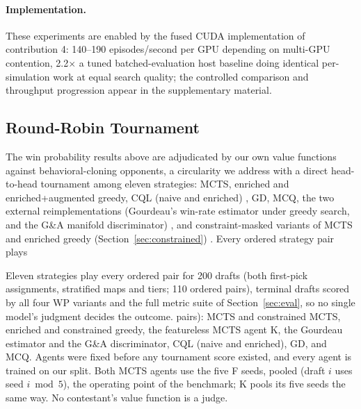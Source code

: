 \documentclass[journal]{IEEEtran}
\providecommand{\DIFaddtex}[1]{{\protect\color{blue} \sf #1}} %
\providecommand{\DIFdeltex}[1]{{\protect\color{red} \scriptsize #1}} %
\providecommand{\DIFaddbegin}{} %
\providecommand{\DIFaddend}{} %
\providecommand{\DIFdelbegin}{} %
\providecommand{\DIFdelend}{} %
\providecommand{\DIFadd}[1]{\texorpdfstring{\DIFaddtex{#1}}{#1}} %
\providecommand{\DIFdel}[1]{\texorpdfstring{\DIFdeltex{#1}}{}} %
\begin{document}
\DIFdelbegin \paragraph{\DIFdel{Implementation.}} %
\addtocounter{paragraph}{-1}%
\DIFdel{These experiments are enabled by the fused CUDA implementation of contribution 4: 140--190 episodes/second per GPU depending on multi-GPU contention, 2.2$\times$ a tuned batched-evaluation host baseline doing identical per-simulation work at equal search quality; the controlled comparison and throughput progression appear in the supplementary material.
}%

\DIFdelend \subsection{Round-Robin Tournament}
\label{sec:tournament}
\DIFdelbegin %

\DIFdel{The win probability results above are adjudicated by our own value functions against behavioral-cloning opponents, a circularity we address with a direct head-to-head tournament among eleven strategies: MCTS, enriched and enriched+augmented greedy, CQL (naive and enriched) , GD, MCQ, the two external reimplementations (Gourdeau's win-rate estimator under greedy search, and the G\&A manifold discriminator) , and constraint-masked variants of MCTS and enriched greedy (Section~\ref{sec:constrained}) . Every ordered strategy pair plays }\DIFdelend \DIFaddbegin 

\DIFadd{Eleven strategies play every ordered pair for }\DIFaddend 200 drafts (both first-pick assignments, stratified maps and tiers; 110 \DIFdelbegin \DIFdel{ordered pairs), terminal drafts scored by all four WP variants and the full metric suite of Section~\ref{sec:eval}, so no single model's judgment decides the outcome.
}\DIFdelend \DIFaddbegin \DIFadd{pairs): MCTS and constrained MCTS, enriched and constrained greedy, the featureless MCTS agent K, the Gourdeau estimator and the G\&A discriminator, CQL (naive and enriched), GD, and MCQ. Agents were fixed before any tournament score existed, and every agent is trained on our split. Both MCTS agents use the five F seeds, pooled (draft $i$ uses seed $i \bmod 5$), the operating point of the benchmark; K pools its five seeds the same way. No contestant's value function is a judge.
}\DIFaddend 
\end{document}
